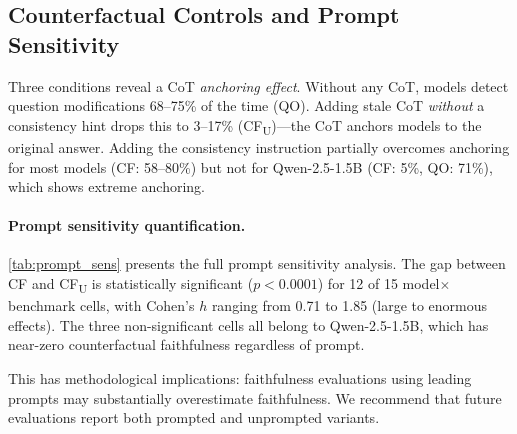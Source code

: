 \documentclass[11pt]{article}
\begin{document}
\subsection{Counterfactual Controls and Prompt Sensitivity}
\label{sec:controls}

Three conditions reveal a CoT \emph{anchoring effect}. Without any CoT, models detect question modifications 68--75\% of the time (QO). Adding stale CoT \emph{without} a consistency hint drops this to 3--17\% (CF\textsubscript{U})---the CoT anchors models to the original answer. Adding the consistency instruction partially overcomes anchoring for most models (CF: 58--80\%) but not for Qwen-2.5-1.5B (CF: 5\%, QO: 71\%), which shows extreme anchoring.

\paragraph{Prompt sensitivity quantification.} \autoref{tab:prompt_sens} presents the full prompt sensitivity analysis. The gap between CF and CF\textsubscript{U} is statistically significant ($p < 0.0001$) for 12 of 15 model$\times$benchmark cells, with Cohen's $h$ ranging from 0.71 to 1.85 (large to enormous effects). The three non-significant cells all belong to Qwen-2.5-1.5B, which has near-zero counterfactual faithfulness regardless of prompt.

This has methodological implications: faithfulness evaluations using leading prompts may substantially overestimate faithfulness. We recommend that future evaluations report both prompted and unprompted variants.
\end{document}
